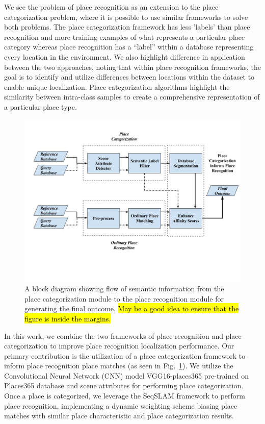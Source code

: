 \documentclass[letterpaper, 10 pt, conference]{ieeeconf}  %
\begin{document}
We see the problem of place recognition as an extension to the place categorization problem, where it is possible to use similar frameworks to solve both problems. The place categorization framework has less 'labels' than place recognition and more training examples of what represents a particular place category whereas place recognition has a ``label'' within a database representing every location in the environment. We also highlight difference in application between the two approaches, noting that within place recognition frameworks, the goal is to identify and utilize differences between locations within the dataset to enable unique localization. Place categorization algorithms highlight the similarity between intra-class samples to create a comprehensive representation of a particular place type. 

\begin{figure}
	\includegraphics[clip, trim=1cm 5cm 0cm 2cm,scale=0.3]{flowchart}
	\caption{A block diagram showing flow of semantic information from the place categorization module to the place recognition module for generating the final outcome. \hl{May be a good idea to ensure that the figure is inside the margins.}}
	\label{fig:flowchart}
\end{figure}

In this work, we combine the two frameworks of place recognition and place categorization to improve place recognition localization performance. Our primary contribution is the utilization of a place categorization framework to inform place recognition place matches (as seen in Fig.~\ref{fig:flowchart}).  We utilize the Convolutional Neural Network (CNN) model VGG16-places365 \cite{cnnPlaces365Github} pre-trained on Places365 database \cite{zhou2014learning} and scene attributes  \cite{Patterson2012SunAttributes} for performing place categorization. Once a place is categorized, we leverage the SeqSLAM framework to perform place recognition, implementing a dynamic weighting scheme biasing place matches with similar place characteristic and place categorization results. 
\end{document}
